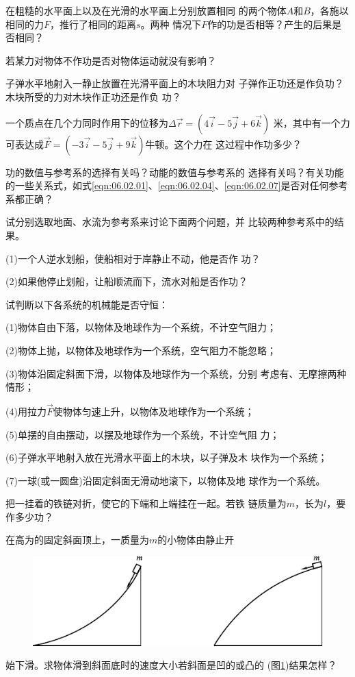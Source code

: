 \begin{questions}

  \question 在粗糙的水平面上以及在光滑的水平面上分别放置相同
  的两个物体$ A $和$ B $，各施以相同的力$ F $，推行了相同的距离$ s $。两种
  情况下$ F $作的功是否相等？产生的后果是否相同？

  \question 若某力对物体不作功是否对物体运动就没有影响？

  \question 子弹水平地射入一静止放置在光滑平面上的木块阻力对
  子弹作正功还是作负功？木块所受的力对木块作正功还是作负
  功？

  \question 一个质点在几个力同时作用下的位移为$ \Delta \vec{r} = \left( 4 \vec{i} - 5 \vec{j} + 6 \vec{k} \right) $
  米，其中有一个力可表达成$ \vec{F} = \left( - 3 \vec{i} - 5 \vec{j} + 9 \vec{k} \right) $牛顿。这个力在
  这过程中作功多少？

  \question 功的数值与参考系的选择有关吗？动能的数值与参考系的
  选择有关吗？有关功能的一些关系式，如式\eqref{eqn:06.02.01}、\eqref{eqn:06.02.04}、\eqref{eqn:06.02.07}是否对任何参考系都正确？

  \question 试分别选取地面、水流为参考系来讨论下面两个问题，并
  比较两种参考系中的结果。

  (1)一个人逆水划船，使船相对于岸静止不动，他是否作
  功？

  (2)如果他停止划船，让船顺流而下，流水对船是否作功？

  \question 试判断以下各系统的机械能是否守恒：

  (1)物体自由下落，以物体及地球作为一个系统，不计空气阻力；

  (2)物体上抛，以物体及地球作为一个系统，空气阻力不能忽略；

  (3)物体沿固定斜面下滑，以物体及地球作为一个系统，分别
  考虑有、无摩擦两种情形；

  (4)用拉力$ \vec{F} $使物体匀速上升，以物体及地球作为一个系统；

  (5)单摆的自由摆动，以摆及地球作为一个系统，不计空气阻
  力；

  (6)子弹水平地射入放在光滑水平面上的木块，以子弹及木
  块作为一个系统；

  (7)一球(或一圆盘)沿固定斜面无滑动地滚下，以物体及地
  球作为一个系统。

  \question 把一挂着的铁链对折，使它的下端和上端挂在一起。若铁
  链质量为$ m $，长为$ l $，要作多少功？

  \question 在高为的固定斜面顶上，一质量为$ m $的小物体由静止开
  \begin{figure}[h]
    \centering
    \includegraphics{figure/fig06.14}
    \caption{}
    \label{fig:06.14}
    \vspace{-0.8em}
  \end{figure}
  \clearpage\noindent
  始下滑。求物体滑到斜面底时的速度大小若斜面是凹的或凸的
  (图\ref{fig:06.14})结果怎样？


\end{questions}

